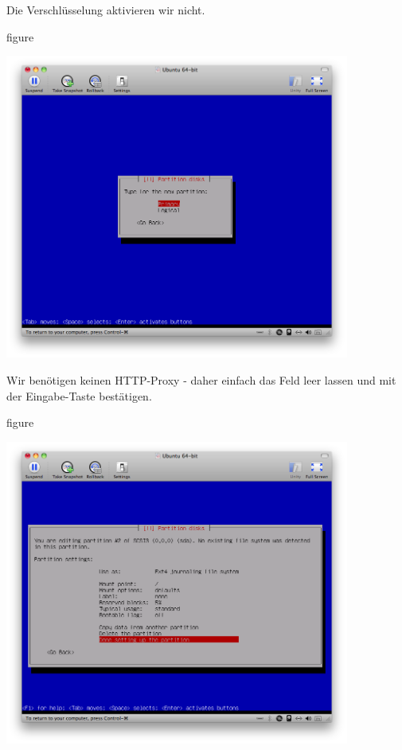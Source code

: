 Die Verschlüsselung aktivieren wir nicht.

\begin{nofloat}{figure}
\begin{center}
\includegraphics[width=0.85\textwidth]{screenshots/24_ubuntu_install.png}
\end{center}
\end{nofloat}

\pagebreak
Wir benötigen keinen HTTP-Proxy - daher einfach das Feld leer lassen
und mit der Eingabe-Taste bestätigen.

\begin{nofloat}{figure}
\begin{center}
\includegraphics[width=0.85\textwidth]{screenshots/25_ubuntu_install.png}
\end{center}
\end{nofloat}

